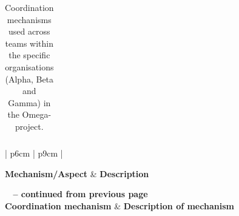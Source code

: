 \begin{center}
\begin{longtable}{| p{6cm} | p{9cm} |}
    \caption{Coordination mechanisms used across teams within the specific organisations (Alpha, Beta and Gamma) in the Omega-project.}
    \label{cmuasito}
    \end{longtable}
\end{center}

\begin{center}
    \begin{longtable}{| p{6cm} | p{9cm} |}
   
    \hline \textbf{Mechanism/Aspect} & \textbf{Description} \\ \hline
    \endfirsthead

{{\bfseries \tablename\ \thetable{} -- continued from previous page}} \\ \hline
    \textbf{Coordination mechanism} & \textbf{Description of mechanism} \\ \hline
    \endhead

     \\ \hline
    \endfoot

   \endlastfoot 


\end{longtable}
\end{center}
